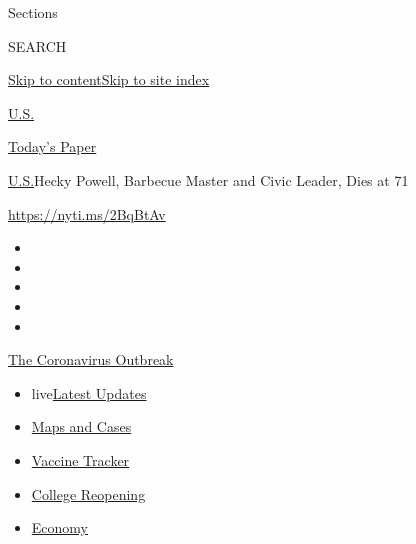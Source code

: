 Sections

SEARCH

\protect\hyperlink{site-content}{Skip to
content}\protect\hyperlink{site-index}{Skip to site index}

\href{https://www.nytimes3xbfgragh.onion/section/us}{U.S.}

\href{https://myaccount.nytimes3xbfgragh.onion/auth/login?response_type=cookie\&client_id=vi}{}

\href{https://www.nytimes3xbfgragh.onion/section/todayspaper}{Today's
Paper}

\href{/section/us}{U.S.}\textbar{}Hecky Powell, Barbecue Master and
Civic Leader, Dies at 71

\url{https://nyti.ms/2BqBtAv}

\begin{itemize}
\item
\item
\item
\item
\item
\end{itemize}

\href{https://www.nytimes3xbfgragh.onion/news-event/coronavirus?action=click\&pgtype=Article\&state=default\&region=TOP_BANNER\&context=storylines_menu}{The
Coronavirus Outbreak}

\begin{itemize}
\tightlist
\item
  live\href{https://www.nytimes3xbfgragh.onion/2020/08/04/world/coronavirus-covid-19.html?action=click\&pgtype=Article\&state=default\&region=TOP_BANNER\&context=storylines_menu}{Latest
  Updates}
\item
  \href{https://www.nytimes3xbfgragh.onion/interactive/2020/us/coronavirus-us-cases.html?action=click\&pgtype=Article\&state=default\&region=TOP_BANNER\&context=storylines_menu}{Maps
  and Cases}
\item
  \href{https://www.nytimes3xbfgragh.onion/interactive/2020/science/coronavirus-vaccine-tracker.html?action=click\&pgtype=Article\&state=default\&region=TOP_BANNER\&context=storylines_menu}{Vaccine
  Tracker}
\item
  \href{https://www.nytimes3xbfgragh.onion/2020/08/02/us/covid-college-reopening.html?action=click\&pgtype=Article\&state=default\&region=TOP_BANNER\&context=storylines_menu}{College
  Reopening}
\item
  \href{https://www.nytimes3xbfgragh.onion/live/2020/08/03/business/stock-market-today-coronavirus?action=click\&pgtype=Article\&state=default\&region=TOP_BANNER\&context=storylines_menu}{Economy}
\end{itemize}

